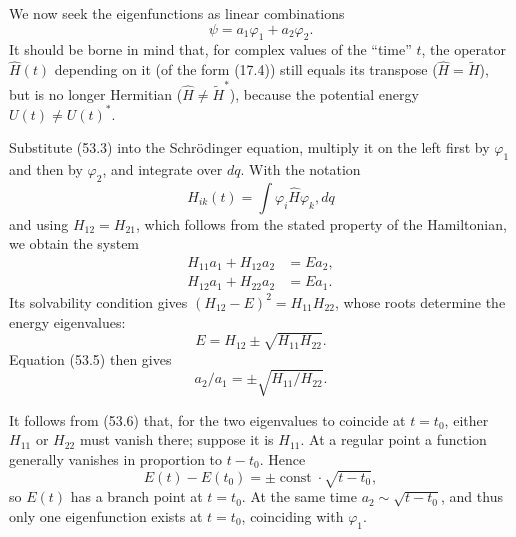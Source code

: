 We now seek the eigenfunctions as linear combinations
\begin{equation}
 \psi=a_1\varphi_1+a_2\varphi_2.
 \tag{53.3}
\end{equation}
It should be borne in mind that, for complex values of the ``time'' $t$, the operator $\widehat H(t)$ depending on it (of the form (17.4)) still equals its transpose ($\widehat H=\widetilde H$), but is no longer Hermitian ($\widehat H\ne\widetilde H^*$), because the potential energy $U(t)\ne U(t)^*$.

Substitute (53.3) into the Schrödinger equation, multiply it on the left first by $\varphi_1$ and then by $\varphi_2$, and integrate over $dq$. With the notation
\begin{equation}
 H_{ik}(t)=\int\varphi_i\widehat H\varphi_k,dq
 \tag{53.4}
\end{equation}
and using $H_{12}=H_{21}$, which follows from the stated property of the Hamiltonian, we obtain the system
\begin{equation}
 \begin{aligned}
 H_{11}a_1+H_{12}a_2&=Ea_2,\\
 H_{12}a_1+H_{22}a_2&=Ea_1.
 \end{aligned}
 \tag{53.5}
\end{equation}
Its solvability condition gives $(H_{12}-E)^2=H_{11}H_{22}$, whose roots determine the energy eigenvalues:
\begin{equation}
 E=H_{12}\pm\sqrt{H_{11}H_{22}}.
 \tag{53.6}
\end{equation}
Equation (53.5) then gives
\begin{equation}
 a_2/a_1=\pm\sqrt{H_{11}/H_{22}}.
 \tag{53.7}
\end{equation}

It follows from (53.6) that, for the two eigenvalues to coincide at $t=t_0$, either $H_{11}$ or $H_{22}$ must vanish there; suppose it is $H_{11}$. At a regular point a function generally vanishes in proportion to $t-t_0$. Hence
\begin{equation}
 E(t)-E(t_0)=\pm\operatorname{const}\cdot\sqrt{t-t_0},
 \tag{53.8}
\end{equation}
so $E(t)$ has a branch point at $t=t_0$. At the same time $a_2\sim\sqrt{t-t_0}$, and thus only one eigenfunction exists at $t=t_0$, coinciding with $\varphi_1$.

